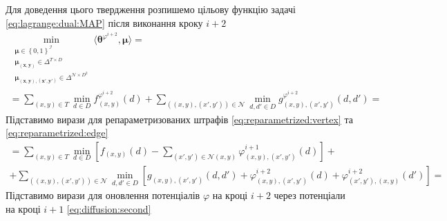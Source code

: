 Для доведення цього твердження розпишемо цільову функцію задачі
\eqref{eq:lagrange:dual:MAP} після виконання кроку $i + 2$
\begin{equation*}
\begin{gathered}
    \min \limits_{\substack{\pmb{\mu} \in \left\{ 0, 1 \right\}^{\mathcal{I}} \\
                            \pmb{\mu_{\left(x, y \right)}} \in \Delta^{T \times D} \\
                            \pmb{\mu_{\left(x, y \right), \left(x', y' \right)}} \in
                                \Delta^{\mathcal{N} \times D^2}}}
        \langle \pmb{\theta}^{\varphi^{i + 2}}, \pmb{\mu} \rangle = \\
    = \sum \limits_{\left(x, y \right) \in T}
        \min \limits_{d \in D}
            f_{\left(x, y \right)}^{\varphi^{i + 2}} \left( d \right) +
    \sum \limits_{\left( \left(x, y \right), \left(x', y' \right) \right) \in \mathcal{N}}
        \min \limits_{d, d' \in D}
            g_{\left(x, y \right), \left(x', y' \right)}^{\varphi^{i + 2}}
                \left( d, d' \right) =
\end{gathered}
\end{equation*}
Підставимо вирази для репараметризованих штрафів \eqref{eq:reparametrized:vertex}
та \eqref{eq:reparametrized:edge}
\begin{equation*}
\begin{gathered}
    = \sum \limits_{\left(x, y \right) \in T}
        \min \limits_{d \in D} \left[
            f_{\left(x, y \right)} \left(d \right) -
            \sum \limits_{\left(x', y' \right) \in \mathcal{N} \left(x, y \right)}
                \varphi_{\left(x, y \right), \left(x', y' \right)}^{i + 1}
                    \left( d \right)
        \right] + \\
    + \sum \limits_{\left(\left(x, y \right), \left(x', y' \right) \right) \in  \mathcal{N}}
        \min \limits_{d, d' \in D} \left[
            g_{\left(x, y \right), \left(x', y' \right)} \left(d, d' \right) +
            \varphi_{\left(x, y \right), \left(x', y' \right)}^{i + 2}
                \left( d \right) +
            \varphi_{\left(x', y' \right), \left(x, y \right)}^{i + 2}
                \left( d' \right)
        \right] =
\end{gathered}
\end{equation*}
Підставимо вирази для оновлення потенціалів $\varphi$ на кроці $i + 2$
через потенціали на кроці $i + 1$ \eqref{eq:diffusion:second}
